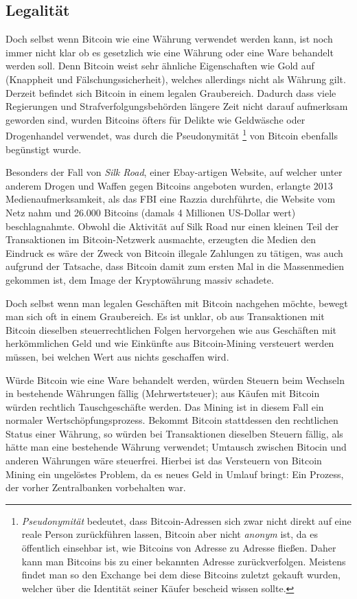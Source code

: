 \subsection{Legalität}

Doch selbst wenn Bitcoin wie eine Währung verwendet werden kann, ist noch immer nicht klar ob es gesetzlich wie eine Währung oder eine Ware behandelt werden soll.
Denn Bitcoin weist sehr ähnliche Eigenschaften wie Gold auf (Knappheit und Fälschungssicherheit), welches allerdings nicht als Währung gilt.
Derzeit befindet sich Bitcoin in einem legalen Graubereich.
Dadurch dass viele Regierungen und Strafverfolgungsbehörden längere Zeit nicht darauf aufmerksam geworden sind, wurden Bitcoins öfters für Delikte wie Geldwäsche  oder Drogenhandel  verwendet, was durch die Pseudonymität%
\footnote{\emph{Pseudonymität} bedeutet, dass Bitcoin-Adressen sich zwar nicht direkt auf eine reale Person zurückführen lassen, Bitcoin aber nicht \emph{anonym} ist, da es öffentlich einsehbar ist, wie Bitcoins von Adresse zu Adresse fließen.
Daher kann man Bitcoins bis zu einer bekannten Adresse zurückverfolgen.
Meistens findet man so den Exchange bei dem diese Bitcoins zuletzt gekauft wurden, welcher über die Identität seiner Käufer bescheid wissen sollte.}
von Bitcoin ebenfalls begünstigt wurde.

Besonders der Fall von \emph{Silk Road}, einer Ebay-artigen Website, auf welcher unter anderem Drogen und Waffen gegen Bitcoins angeboten wurden, erlangte 2013 Medienaufmerksamkeit, als das FBI eine Razzia durchführte, die Website vom Netz nahm und 26.000 Bitcoins (damals 4 Millionen US-Dollar wert) beschlagnahmte.
Obwohl die Aktivität auf Silk Road nur einen kleinen Teil der Transaktionen im Bitcoin-Netzwerk ausmachte, erzeugten die Medien den Eindruck es wäre der Zweck von Bitcoin illegale Zahlungen zu tätigen, was auch aufgrund der Tatsache, dass Bitcoin damit zum ersten Mal in die Massenmedien gekommen ist, dem Image der Kryptowährung massiv schadete.

Doch selbst wenn man legalen Geschäften mit Bitcoin nachgehen möchte, bewegt man sich oft in einem Graubereich.
Es ist unklar, ob aus Transaktionen mit Bitcoin dieselben steuerrechtlichen Folgen hervorgehen wie aus Geschäften mit herkömmlichen Geld und wie Einkünfte aus Bitcoin-Mining versteuert werden müssen, bei welchen Wert aus nichts geschaffen wird.

Würde Bitcoin wie eine Ware behandelt werden, würden Steuern beim Wechseln in bestehende Währungen fällig (Mehrwertsteuer); aus Käufen mit Bitcoin würden rechtlich Tauschgeschäfte werden.
Das Mining ist in diesem Fall ein normaler Wertschöpfungsprozess.
Bekommt Bitcoin stattdessen den rechtlichen Status einer Währung, so würden bei Transaktionen dieselben Steuern fällig, als hätte man eine bestehende Währung verwendet; Umtausch zwischen Bitocin und anderen Währungen wäre steuerfrei.
Hierbei ist das Versteuern von Bitcoin Mining ein ungelöstes Problem, da es neues Geld in Umlauf bringt:
Ein Prozess, der vorher Zentralbanken vorbehalten war.
